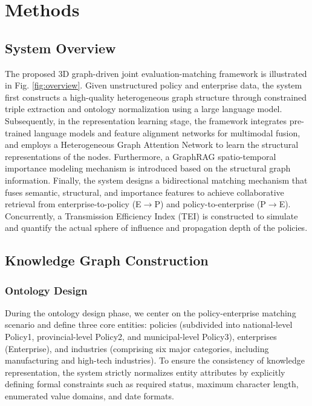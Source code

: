 \section{Methods}
\label{sec:methods}

\subsection{System Overview}
The proposed 3D graph-driven joint evaluation-matching framework is illustrated in Fig. \ref{fig:overview}. Given unstructured policy and enterprise data, the system first constructs a high-quality heterogeneous graph structure through constrained triple extraction and ontology normalization using a large language model. Subsequently, in the representation learning stage, the framework integrates pre-trained language models and feature alignment networks for multimodal fusion, and employs a Heterogeneous Graph Attention Network to learn the structural representations of the nodes. Furthermore, a GraphRAG spatio-temporal importance modeling mechanism is introduced based on the structural graph information. Finally, the system designs a bidirectional matching mechanism that fuses semantic, structural, and importance features to achieve collaborative retrieval from enterprise-to-policy (E$\rightarrow$P) and policy-to-enterprise (P$\rightarrow$E). Concurrently, a Transmission Efficiency Index (TEI) is constructed to simulate and quantify the actual sphere of influence and propagation depth of the policies.

\subsection{Knowledge Graph Construction}

\subsubsection{Ontology Design}
During the ontology design phase, we center on the policy-enterprise matching scenario and define three core entities: policies (subdivided into national-level Policy1, provincial-level Policy2, and municipal-level Policy3), enterprises (Enterprise), and industries (comprising six major categories, including manufacturing and high-tech industries). To ensure the consistency of knowledge representation, the system strictly normalizes entity attributes by explicitly defining formal constraints such as required status, maximum character length, enumerated value domains, and date formats.

